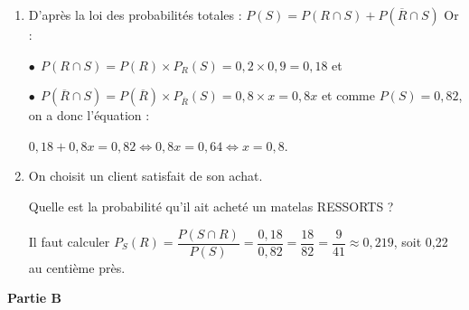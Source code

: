 \begin{enumerate}[start=2]
\item %
D'après la loi des probabilités totales :
$P(S) = P(R \cap S) + P\left(\overline{R} \cap S \right)$ Or :

$\bullet~~P(R \cap S) = P(R) \times P_R(S) = 0,2 \times 0,9 = 0,18$ et 

$\bullet~~P\left(\overline{R} \cap S \right) = P\left(\overline{R}\right) \times P_{\overline{R}}(S) = 0,8 \times x = 0,8x$ et comme $P(S) = 0,82$, on a donc l'équation :

$0,18 + 0,8x = 0,82 \iff 0,8x = 0,64 \iff x = 0,8$.
\item On choisit un client satisfait de son achat.

Quelle est la probabilité qu'il ait acheté un matelas RESSORTS ?

Il faut calculer $P_S(R) = \dfrac{P(S \cap R)}{P(S)} = \dfrac{0,18}{0,82} = \dfrac{18}{82} = \dfrac{9}{41} \approx 0,219$, soit 0,22 au centième près.
\end{enumerate}
\medskip

\medskip

\textbf{Partie B}

\medskip

